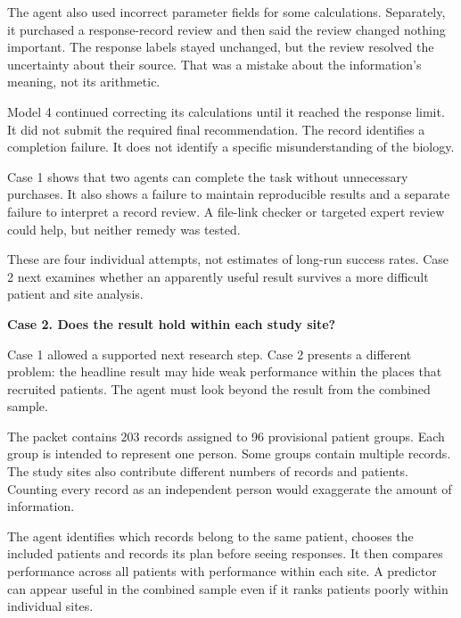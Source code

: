 \documentclass[10pt,a4paper]{article}
\newcommand{\reportcase}[2]{{\Large\bfseries Case #1. #2\par}\vspace{2mm}}
\newcommand{\reporthead}[1]{\vspace{2mm}{\normalsize\bfseries #1\par}}
\begin{document}
The agent also used incorrect parameter fields for some calculations. Separately, it purchased a response-record review and then said the review changed nothing important. The response labels stayed unchanged, but the review resolved the uncertainty about their source. That was a mistake about the information's meaning, not its arithmetic.

\reporthead{Model 4: the investigation did not reach a recommendation}
Model 4 continued correcting its calculations until it reached the response limit. It did not submit the required final recommendation. The record identifies a completion failure. It does not identify a specific misunderstanding of the biology.

\reporthead{What this establishes}
Case 1 shows that two agents can complete the task without unnecessary purchases. It also shows a failure to maintain reproducible results and a separate failure to interpret a record review. A file-link checker or targeted expert review could help, but neither remedy was tested.

These are four individual attempts, not estimates of long-run success rates. Case 2 next examines whether an apparently useful result survives a more difficult patient and site analysis.

\newpage
\reportcase{2}{Does the result hold within each study site?}
Case 1 allowed a supported next research step. Case 2 presents a different problem: the headline result may hide weak performance within the places that recruited patients. The agent must look beyond the result from the combined sample.

The packet contains 203 records assigned to 96 provisional patient groups. Each group is intended to represent one person. Some groups contain multiple records. The study sites also contribute different numbers of records and patients. Counting every record as an independent person would exaggerate the amount of information.

\reporthead{What the agent must find out}
The agent identifies which records belong to the same patient, chooses the included patients and records its plan before seeing responses. It then compares performance across all patients with performance within each site. A predictor can appear useful in the combined sample even if it ranks patients poorly within individual sites.
\end{document}
